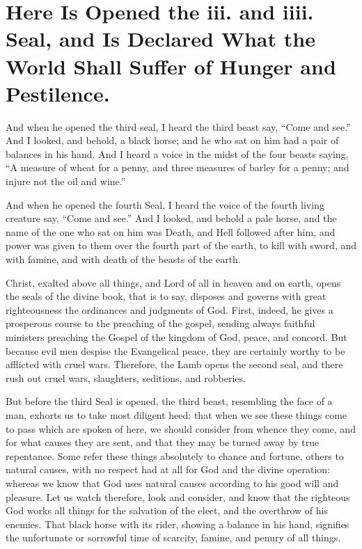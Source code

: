 \chapter[Sermon 31. Here Is Opened the iii. and iiii. Seal, and Is Declared What the World Shall Suffer of Hunger and Pestilence.]{Here Is Opened the iii. and iiii. Seal, and Is Declared What the World Shall Suffer of Hunger and Pestilence.}
\label{sermon:031}

And when he opened the third seal, I heard the third beast say, “Come and see.” And I looked, and behold, a black horse; and he who sat on him had a pair of balances in his hand. And I heard a voice in the midst of the four beasts saying, “A measure of wheat for a penny, and three measures of barley for a penny; and injure not the oil and wine.”

And when he opened the fourth Seal, I heard the voice of the fourth living creature say, “Come and see.” And I looked, and behold a pale horse, and the name of the one who sat on him was Death, and Hell followed after him, and power was given to them over the fourth part of the earth, to kill with sword, and with famine, and with death of the beasts of the earth.

Christ, exalted above all things, and Lord of all in heaven and on earth, opens the seals of the divine book, that is to say, disposes and governs with great righteousness the ordinances and judgments of God. First, indeed, he gives a prosperous course to the preaching of the gospel, sending always faithful ministers preaching the Gospel of the kingdom of God, peace, and concord. But because evil men despise the Evangelical peace, they are certainly worthy to be afflicted with cruel wars. Therefore, the Lamb opens the second seal, and there rush out cruel wars, slaughters, seditions, and robberies.

But before the third Seal is opened, the third beast, resembling the face of a man, exhorts us to take most diligent heed: that when we see these things come to pass which are spoken of here, we should consider from whence they come, and for what causes they are sent, and that they may be turned away by true repentance. Some refer these things absolutely to chance and fortune, others to natural causes, with no respect had at all for God and the divine operation: whereas we know that God uses natural causes according to his good will and pleasure. Let us watch therefore, look and consider, and know that the righteous God works all things for the salvation of the elect, and the overthrow of his enemies. That black horse with its rider, showing a balance in his hand, signifies the unfortunate or sorrowful time of scarcity, famine, and penury of all things.

